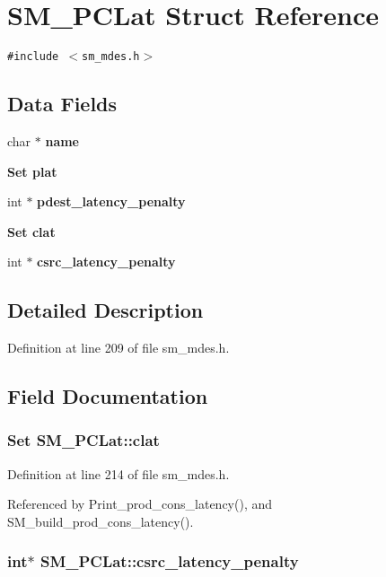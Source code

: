 \section{SM\_\-PCLat Struct Reference}
\label{structSM__PCLat}
{\tt \#include $<$sm\_\-mdes.h$>$}

\subsection*{Data Fields}
\begin{CompactItemize}
\item 
char $\ast$ \bf{name}
\item 
\bf{Set} \bf{plat}
\item 
int $\ast$ \bf{pdest\_\-latency\_\-penalty}
\item 
\bf{Set} \bf{clat}
\item 
int $\ast$ \bf{csrc\_\-latency\_\-penalty}
\end{CompactItemize}


\subsection{Detailed Description}




Definition at line 209 of file sm\_\-mdes.h.

\subsection{Field Documentation}
\subsubsection{\setlength{\rightskip}{0pt plus 5cm}\bf{Set} \bf{SM\_\-PCLat::clat}}\label{structSM__PCLat_7cc8f498354de10029a2ebcfd45fa848}




Definition at line 214 of file sm\_\-mdes.h.

Referenced by Print\_\-prod\_\-cons\_\-latency(), and SM\_\-build\_\-prod\_\-cons\_\-latency().
\subsubsection{\setlength{\rightskip}{0pt plus 5cm}int$\ast$ \bf{SM\_\-PCLat::csrc\_\-latency\_\-penalty}}\label{structSM__PCLat_5d4ca8faea74f146540cf39c6a1e2130}




